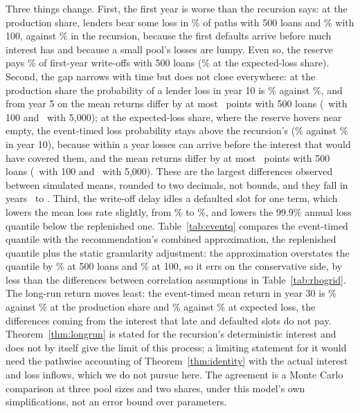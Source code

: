 \documentclass[11pt]{article}
\theoremstyle{plain}
\theoremstyle{definition}
\begin{document}
Three things change. First, the first year is worse than the recursion says: at the
production share, lenders bear some loss in \EventYearOneLossRec\% of paths with 500 loans and
\EventYearOneLossRecHundred\% with 100, against \AnnualYearOneLossRec\% in the recursion, because the
first defaults arrive before much interest has and because a small pool's losses are lumpy. Even so, the
reserve pays \EventCoverRec\% of first-year write-offs with 500 loans (\EventCoverEl\% at the
expected-loss share). Second, the gap narrows with time but does not close everywhere: at the
production share the probability of a lender loss in year 10 is \EventYearTenLossRec\% against
\AnnualYearTenLossRec\%, and from year 5 on the mean returns differ by at most
\EventDiffMaxRecFiveHundred\ points with 500 loans (\EventDiffMaxRecHundred\ with 100 and
\EventDiffMaxRecFiveThousand\ with 5,000); at the expected-loss share, where the reserve hovers near
empty, the event-timed loss probability stays above the recursion's (\EventYearTenLossEl\% against
\AnnualYearTenLossEl\% in year 10), because within a year losses can arrive before the interest that
would have covered them, and the mean returns differ by at most \EventDiffMaxElFiveHundred\ points
with 500 loans (\EventDiffMaxElHundred\ with 100 and \EventDiffMaxElFiveThousand\ with 5,000). These
are the largest differences observed between simulated means, rounded to two decimals, not bounds,
and they fall in years \EventDiffYearMin\ to \EventDiffYearMax. Third, the write-off
delay idles a defaulted slot for one term, which lowers the mean loss rate slightly, from
\ReplenishedEL\% to \EventMeanLossFiveHundred\%, and lowers the 99.9\% annual loss quantile below the
replenished one. Table~\ref{tab:eventq} compares the event-timed quantile with the recommendation's
combined approximation, the replenished quantile plus the static granularity adjustment: the
approximation overstates the quantile by \CombinedErrFiveHundred\% at 500 loans and
\CombinedErrHundred\% at 100, so it errs on the conservative side, by less than the differences between
correlation assumptions in Table~\ref{tab:rhogrid}. The long-run return moves least: the event-timed
mean return in year 30 is \EventYearThirtyRetRec\% against \AnnualYearThirtyRetRec\% at the production
share and \EventYearThirtyRetEl\% against \AnnualYearThirtyRetEl\% at expected loss, the differences
coming from the interest that late and defaulted slots do not pay. Theorem~\ref{thm:longrun} is stated
for the recursion's deterministic interest and does not by itself give the limit of this process; a
limiting statement for it would need the pathwise accounting of Theorem~\ref{thm:identity} with the
actual interest and loss inflows, which we do not pursue here. The agreement is a Monte Carlo
comparison at three pool sizes and two shares, under this model's own simplifications, not an error
bound over parameters.
\end{document}
